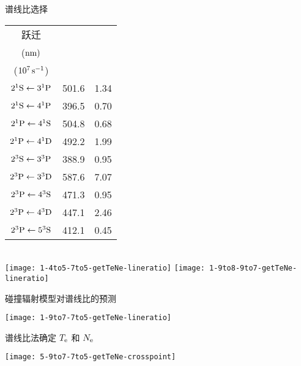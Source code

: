 \begin{CJK*}{UTF8}{kai}
\begin{frame}{谱线比选择}
	\begin{center}{\tiny
		\begin{tabular}{ccc}\toprule
			跃迁 & \makecell[c]{$\lambda_{q\to p}$\\ (${\rm nm})$} & \makecell[c]{$A_{q\to p}^{\rm eff}$\\ ($10^7\,{\rm s}^{-1}$)}\\
			\hline
			{\color{red}$2^1{\rm S}\leftarrow3^1{\rm P}$} & {\color{red}501.6} & {\color{red}1.34} \\
			{\color{red}$2^1{\rm S}\leftarrow4^1{\rm P}$} & {\color{red}396.5} & {\color{red}0.70} \\
			$2^1{\rm P}\leftarrow4^1{\rm S}$ & 504.8 & 0.68 \\
			$2^1{\rm P}\leftarrow4^1{\rm D}$ & 492.2 & 1.99 \\
			{\color{red}$2^3{\rm S}\leftarrow3^3{\rm P}$} & {\color{red}388.9} & {\color{red}0.95} \\
			$2^3{\rm P}\leftarrow3^3{\rm D}$ & 587.6 & 7.07 \\
			$2^3{\rm P}\leftarrow4^3{\rm S}$ & 471.3 & 0.95 \\
			$2^3{\rm P}\leftarrow4^3{\rm D}$ & 447.1 & 2.46 \\
			{\color{magenta}$2^3{\rm P}\leftarrow5^3{\rm S}$} & {\color{magenta}412.1} & {\color{magenta}0.45} \\
			\bottomrule
		\end{tabular}
		}\\
		{\color{green}}
		\texttt{[image: 1-4to5-7to5-getTeNe-lineratio]}
		\texttt{[image: 1-9to8-9to7-getTeNe-lineratio]}
	\end{center}
\end{frame}

\begin{frame}{碰撞辐射模型对谱线比的预测}
	\vspace{-0.3cm}
	\begin{center}
		\texttt{[image: 1-9to7-7to5-getTeNe-lineratio]}
	\end{center}
\end{frame}

\begin{frame}{谱线比法确定 $T_{\rm e}$ 和 $N_{\rm e}$}
	\vspace{-0.3cm}
	\begin{center}
		\texttt{[image: 5-9to7-7to5-getTeNe-crosspoint]}
	\end{center}
\end{frame}





\end{CJK*}
